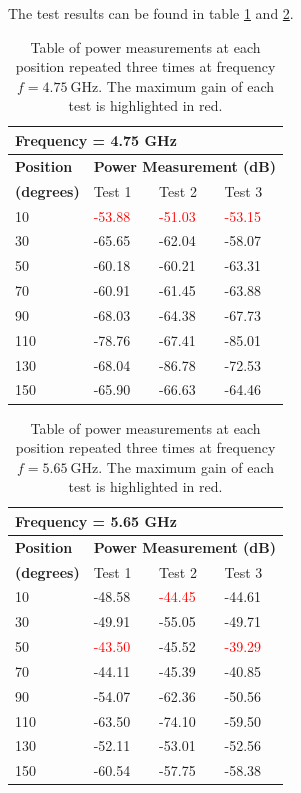 The test results can be found in table \ref{tab:a2_5a} and \ref{tab:a2_5b}.
\begin{table}[H]
    \centering
    \begin{tabular}{l|l|l|l}
        \multicolumn{4}{l}{\textbf{Frequency = 4.75 GHz}}         \\
        \hline
        \textbf{Position} & \multicolumn{3}{l}{\textbf{Power Measurement (dB)}} \\
        \textbf{(degrees)}  & Test 1    & Test 2  & Test 3  \\
        \hline
        \hline
        10      & \textcolor{red}{-53.88}    & \textcolor{red}{-51.03}    & \textcolor{red}{-53.15} \\
        30      & -65.65    & -62.04    & -58.07 \\
        50      & -60.18    & -60.21    & -63.31 \\
        70      & -60.91    & -61.45    & -63.88 \\
        90      & -68.03    & -64.38    & -67.73 \\
        110     & -78.76    & -67.41    & -85.01 \\
        130     & -68.04    & -86.78    & -72.53 \\
        150     & -65.90    & -66.63    & -64.46
        \end{tabular}
    \caption{Table of power measurements at each position repeated three times at frequency $f=\SI{4.75}{\giga\hertz}$. The maximum gain of each test is highlighted in red.}
    \label{tab:a2_5a}
\end{table}

\begin{table}[H]
    \centering
    \begin{tabular}{l|l|l|l}
        \multicolumn{4}{l}{\textbf{Frequency = 5.65 GHz}}         \\
        \hline
        \textbf{Position} & \multicolumn{3}{l}{\textbf{Power Measurement (dB)}} \\
        \textbf{(degrees)}  & Test 1    & Test 2  & Test 3  \\
        \hline
        \hline
        10      & -48.58    & \textcolor{red}{-44.45}    & -44.61 \\
        30      & -49.91    & -55.05    & -49.71 \\
        50      & \textcolor{red}{-43.50}    & -45.52    & \textcolor{red}{-39.29} \\
        70      & -44.11    & -45.39    & -40.85 \\
        90      & -54.07    & -62.36    & -50.56 \\
        110     & -63.50    & -74.10    & -59.50 \\
        130     & -52.11    & -53.01    & -52.56 \\
        150     & -60.54    & -57.75    & -58.38
        \end{tabular}
    \caption{Table of power measurements at each position repeated three times at frequency $f=\SI{5.65}{\giga\hertz}$. The maximum gain of each test is highlighted in red.}
    \label{tab:a2_5b}
\end{table}